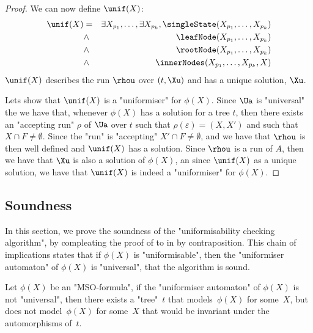 \documentclass[a4paper,UKenglish,cleveref, autoref, thm-restate]{lipics-v2021}
\begin{document}
\begin{proof}
	We can now define $\unif(X)$:
	\begin{eqnarray*}
		\unif (X) &=& \exists X_{p_1}, \ldots, \exists X_{p_k}, \singleState (X_{p_1}, \ldots, X_{p_k}) \\
		&\land& \leafNode (X_{p_1}, \ldots, X_{p_k})\\
		&\land& \rootNode (X_{p_1}, \ldots, X_{p_k})\\
		&\land& \innerNodes (X_{p_1}, \ldots, X_{p_k}, X)
	\end{eqnarray*}
	$\unif(X)$ describes the run $\rhou$ over $(t,\Xu)$ and has a unique solution, $\Xu$.

	Lets show that $\unif(X)$ is a "uniformiser" for $\phi(X)$.
	Since $\Ua$ is "universal" the we have that, whenever $\phi(X)$ has a solution for a tree $t$, then there exists an "accepting run" $\rho$ of $\Ua$ over $t$
	such that $\rho(\varepsilon) = (X,X')$ and such that $X \cap F \neq \emptyset$. Since the "run" is "accepting" $X' \cap F \neq \emptyset$, and we have that
	$\rhou$ is then well defined and $\unif(X)$ has a solution. Since $\rhou$ is a run of $A$, then we have that $\Xu$ is also a solution of $\phi(X)$, an since 
    $\unif(X)$ as a unique solution, we have that $\unif(X)$ is indeed a "uniformiser" for $\phi(X)$.

\end{proof}

\subsection{Soundness}\label{section:soundness}

In this section, we prove the soundness of the "uniformisability checking algorithm", by compleating the proof of  to
 in  by contraposition.
This chain of implications states that if $\phi(X)$ is "uniformisable", then the "uniformiser automaton" of $\phi(X)$ is "universal", \ie that the algorithm is sound.

\begin{lemma}\label{lemma:not-universal-implies-non-invariant}
	Let $\phi(X)$ be an "MSO-formula", if the "uniformiser automaton" of $\phi(X)$ is not  "universal",
	then there exists a "tree"~$t$ that models~$\phi(X)$ for some~$X$, but does not model~$\phi(X)$ for some~$X$
	that would be invariant under the automorphisms of~$t$.
\end{lemma}
\end{document}
